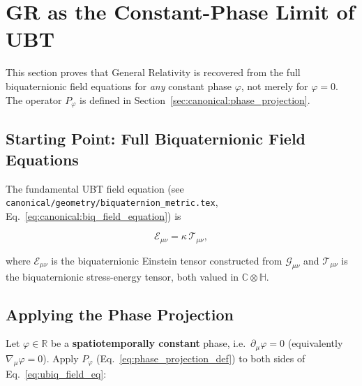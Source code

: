 

\section{GR as the Constant-Phase Limit of UBT}
\label{sec:canonical:gr_as_limit}

This section proves that General Relativity is recovered from the full biquaternionic
field equations for \emph{any} constant phase $\varphi$, not merely for $\varphi = 0$.
The operator $P_\varphi$ is defined in Section~\ref{sec:canonical:phase_projection}.

\subsection{Starting Point: Full Biquaternionic Field Equations}

The fundamental UBT field equation (see \texttt{canonical/geometry/biquaternion\_metric.tex},
Eq.~\ref{eq:canonical:biq_field_equation}) is

\begin{equation}
\label{eq:ubiq_field_eq}
\mathcal{E}_{\mu\nu} = \kappa\,\mathcal{T}_{\mu\nu},
\end{equation}

where $\mathcal{E}_{\mu\nu}$ is the biquaternionic Einstein tensor constructed from
$\mathcal{G}_{\mu\nu}$ and $\mathcal{T}_{\mu\nu}$ is the biquaternionic stress-energy tensor, both
valued in $\mathbb{C}\otimes\mathbb{H}$.

\subsection{Applying the Phase Projection}

Let $\varphi \in \mathbb{R}$ be a \textbf{spatiotemporally constant} phase,
i.e.\ $\partial_\mu\varphi = 0$ (equivalently $\nabla_\mu\varphi = 0$).
Apply $P_\varphi$ (Eq.~\ref{eq:phase_projection_def}) to both sides of
Eq.~\eqref{eq:ubiq_field_eq}:

